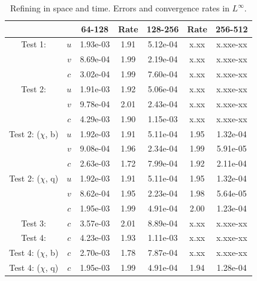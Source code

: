 \documentclass[final]{siamltex}
\begin{document}
\begin{table}[h]
\begin{center}
\caption{Refining in space and time.  Errors and convergence rates in $L^\infty$.}
\begin{tabular}{ccccccc}
& & 64-128 & Rate & 128-256 & Rate & 256-512 \\
\hline
Test 1:             & $u$ & 1.93e-03 & 1.91 & 5.12e-04 & x.xx & x.xxe-xx \\
                    & $v$ & 8.69e-04 & 1.99 & 2.19e-04 & x.xx & x.xxe-xx \\
                    & $c$ & 3.02e-04 & 1.99 & 7.60e-04 & x.xx & x.xxe-xx \\
\hline
Test 2:             & $u$ & 1.91e-03 & 1.92 & 5.06e-04 & x.xx & x.xxe-xx \\
                    & $v$ & 9.78e-04 & 2.01 & 2.43e-04 & x.xx & x.xxe-xx \\
                    & $c$ & 4.29e-03 & 1.90 & 1.15e-03 & x.xx & x.xxe-xx \\
\hline
Test 2: ($\chi$, b) & $u$ & 1.92e-03 & 1.91 & 5.11e-04 & 1.95 & 1.32e-04 \\
                    & $v$ & 9.08e-04 & 1.96 & 2.34e-04 & 1.99 & 5.91e-05 \\
                    & $c$ & 2.63e-03 & 1.72 & 7.99e-04 & 1.92 & 2.11e-04 \\
\hline
Test 2: ($\chi$, q) & $u$ & 1.92e-03 & 1.91 & 5.11e-04 & 1.95 & 1.32e-04 \\
                    & $v$ & 8.62e-04 & 1.95 & 2.23e-04 & 1.98 & 5.64e-05 \\
                    & $c$ & 1.95e-03 & 1.99 & 4.91e-04 & 2.00 & 1.23e-04 \\
\hline
Test 3:             & $c$ & 3.57e-03 & 2.01 & 8.89e-04 & x.xx & x.xxe-xx \\
\hline
Test 4:             & $c$ & 4.23e-03 & 1.93 & 1.11e-03 & x.xx & x.xxe-xx \\
\hline
Test 4: ($\chi$, b) & $c$ & 2.70e-03 & 1.78 & 7.87e-04 & x.xx & x.xxe-xx \\
\hline
Test 4: ($\chi$, q) & $c$ & 1.95e-03 & 1.99 & 4.91e-04 & 1.94 & 1.28e-04
\end{tabular}
\end{center}
\end{table}
\end{document}

